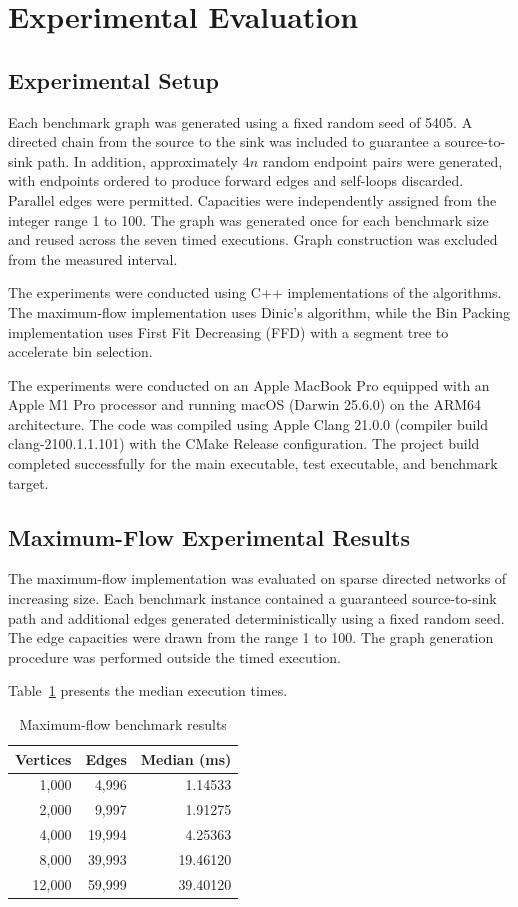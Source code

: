 \section{Experimental Evaluation}

\subsection{Experimental Setup}

Each benchmark graph was generated using a fixed random
seed of 5405. A directed chain from the source to the sink
was included to guarantee a source-to-sink path. In addition,
approximately $4n$ random endpoint pairs were generated,
with endpoints ordered to produce forward edges and
self-loops discarded. Parallel edges were permitted.
Capacities were independently assigned from the integer
range 1 to 100. The graph was generated once for each
benchmark size and reused across the seven timed
executions. Graph construction was excluded from the
measured interval.

The experiments were conducted using C++ implementations of the
algorithms. The maximum-flow implementation uses Dinic's algorithm,
while the Bin Packing implementation uses First Fit Decreasing
(FFD) with a segment tree to accelerate bin selection.

The experiments were conducted on an Apple MacBook Pro
equipped with an Apple M1 Pro processor and running macOS
(Darwin 25.6.0) on the ARM64 architecture. The code was
compiled using Apple Clang 21.0.0
(compiler build clang-2100.1.1.101) with the CMake
Release configuration. The project build completed
successfully for the main executable, test executable,
and benchmark target.

\subsection{Maximum-Flow Experimental Results}

The maximum-flow implementation was evaluated on sparse directed
networks of increasing size. Each benchmark instance contained a
guaranteed source-to-sink path and additional edges generated
deterministically using a fixed random seed. The edge capacities
were drawn from the range 1 to 100. The graph generation procedure
was performed outside the timed execution.

Table~\ref{tab:flow_results} presents the median execution times.

\begin{table}[htbp]
\centering
\caption{Maximum-flow benchmark results}
\label{tab:flow_results}
\begin{tabular}{r r r}
\toprule
Vertices & Edges & Median (ms) \\
\midrule
1,000  & 4,996  & 1.14533 \\
2,000  & 9,997  & 1.91275 \\
4,000  & 19,994 & 4.25363 \\
8,000  & 39,993 & 19.46120 \\
12,000 & 59,999 & 39.40120 \\
\bottomrule
\end{tabular}
\end{table}

